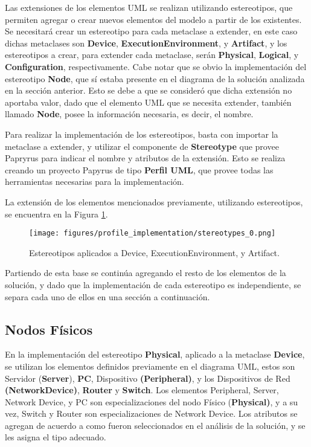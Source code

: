 Las extensiones de los elementos UML se realizan utilizando estereotipos, que permiten agregar o crear nuevos elementos del modelo a partir de los existentes. Se necesitará crear un estereotipo para cada metaclase a extender, en este caso dichas metaclases son \textbf{Device}, \textbf{ExecutionEnvironment}, y \textbf{Artifact}, y los estereotipos a crear, para extender cada metaclase, serán \textbf{Physical}, \textbf{Logical}, y \textbf{Configuration}, respectivamente. Cabe notar que se obvio la implementación del estereotipo \textbf{Node}, que sí estaba presente en el diagrama de la solución analizada en la sección anterior. Esto se debe a que se consideró que dicha extensión no aportaba valor, dado que el elemento UML que se necesita extender, también llamado \textbf{Node}, posee la información necesaria, es decir, el nombre.

Para realizar la implementación de los estereotipos, basta con importar la metaclase a extender, y utilizar el componente de \textbf{Stereotype} que provee Papryrus para indicar el nombre y atributos de la extensión.
Esto se realiza creando un proyecto Papyrus de tipo \textbf{Perfil UML}, que provee todas las herramientas necesarias para la implementación.

La extensión de los elementos mencionados previamente, utilizando estereotipos, se encuentra en la Figura \ref{fig:profile:base_stereotypes}.

\begin{figure}[htbp]
    \centering
    \texttt{[image: figures/profile\_implementation/stereotypes\_0.png]}
    \caption{Estereotipos aplicados a Device, ExecutionEnvironment, y Artifact.}
    \label{fig:profile:base_stereotypes}
\end{figure}

Partiendo de esta base se continúa agregando el resto de los elementos de la solución, y dado que la implementación de cada estereotipo es independiente, se separa cada uno de ellos en una sección a continuación.

\subsection{Nodos Físicos}
En la implementación del estereotipo \textbf{Physical}, aplicado a la metaclase \textbf{Device}, se utilizan los elementos definidos previamente en el diagrama UML, estos son Servidor (\textbf{Server}), \textbf{PC}, Dispositivo \textbf{(Peripheral)}, y los Dispositivos de Red \textbf{(NetworkDevice)}, \textbf{Router} y \textbf{Switch}. Los elementos Peripheral, Server, Network Device, y PC son especializaciones del nodo Físico (\textbf{Physical)}, y a su vez, Switch y Router son especializaciones de Network Device. Los atributos se agregan de acuerdo a como fueron seleccionados en el análisis de la solución, y se les asigna el tipo adecuado.


